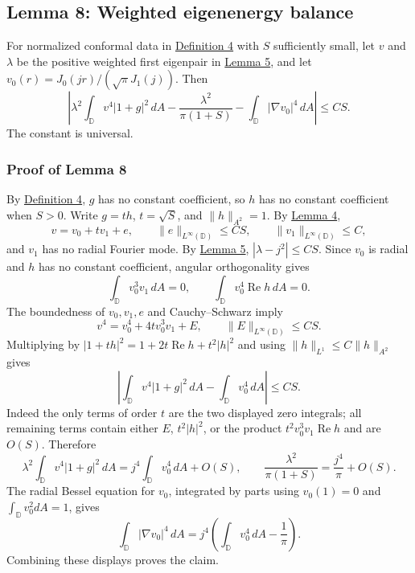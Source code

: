 \documentclass[11pt]{article}
\begin{document}
\subsection{Lemma 8: Weighted eigenenergy
balance}\label{lem-weighted-eigen-balance}

For normalized conformal data in
\hyperref[def-conformal-data]{Definition 4} with \(S\) sufficiently
small, let \(v\) and \(\lambda\) be the positive weighted first
eigenpair in \hyperref[lem-disk-perturbation]{Lemma 5}, and let
\(v_0(r)=J_0(jr)/(\sqrt\pi J_1(j))\). Then \[
\left|\lambda^2\int_{\mathbb D}v^4|1+g|^2\,dA-
\frac{\lambda^2}{\pi(1+S)}-
\int_{\mathbb D}|\nabla v_0|^4\,dA\right|\le CS.
\] The constant is universal.

\subsubsection{Proof of Lemma 8}\label{proof-lem-weighted-eigen-balance}

By \hyperref[def-conformal-data]{Definition 4}, \(g\) has no constant
coefficient, so \(h\) has no constant coefficient when \(S>0\). Write
\(g=th\), \(t=\sqrt S\), and \(\|h\|_{A^2}=1\). By
\hyperref[lem-c1-perturbation]{Lemma 4}, \[
v=v_0+t v_1+e,
\qquad \|e\|_{L^\infty(\mathbb D)}\le CS,
\qquad \|v_1\|_{L^\infty(\mathbb D)}\le C,
\] and \(v_1\) has no radial Fourier mode. By
\hyperref[lem-disk-perturbation]{Lemma 5}, \(|\lambda-j^2|\le CS\).
Since \(v_0\) is radial and \(h\) has no constant coefficient, angular
orthogonality gives \[
\int_{\mathbb D}v_0^3v_1\,dA=0,
\qquad
\int_{\mathbb D}v_0^4\operatorname{Re}h\,dA=0.
\] The boundedness of \(v_0,v_1,e\) and Cauchy--Schwarz imply \[
v^4=v_0^4+4t v_0^3v_1+E,
\qquad \|E\|_{L^\infty(\mathbb D)}\le CS.
\] Multiplying by \(|1+th|^2=1+2t\operatorname{Re}h+t^2|h|^2\) and using
\(\|h\|_{L^1}\le C\|h\|_{A^2}\) gives \[
\left|\int_{\mathbb D}v^4|1+g|^2\,dA-\int_{\mathbb D}v_0^4\,dA\right|\le CS.
\] Indeed the only terms of order \(t\) are the two displayed zero
integrals; all remaining terms contain either \(E\), \(t^2|h|^2\), or
the product \(t^2v_0^3v_1\operatorname{Re}h\) and are \(O(S)\).
Therefore \[
\lambda^2\int_{\mathbb D}v^4|1+g|^2\,dA
=j^4\int_{\mathbb D}v_0^4\,dA+O(S),
\qquad
\frac{\lambda^2}{\pi(1+S)}=\frac{j^4}{\pi}+O(S).
\] The radial Bessel equation for \(v_0\), integrated by parts using
\(v_0(1)=0\) and \(\int_{\mathbb D}v_0^2dA=1\), gives \[
\int_{\mathbb D}|\nabla v_0|^4\,dA
=j^4\left(\int_{\mathbb D}v_0^4\,dA-\frac1\pi\right).
\] Combining these displays proves the claim.
\end{document}
